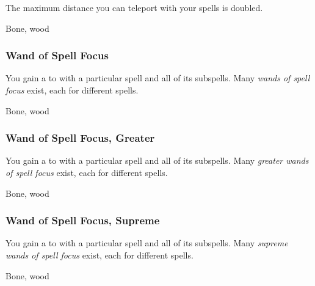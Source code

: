 The maximum distance you can teleport with your  spells is doubled.



 


 Bone, wood


\lowercase{\hypertarget{item:Wand of Spell Focus}{}}\label{item:Wand of Spell Focus}
\hypertarget{item:Wand of Spell Focus}{\subsubsection{Wand of Spell Focus\hfill{}}}

You gain a   to  with a particular spell and all of its subspells.
Many \textit{wands of spell focus} exist, each for different spells.



 


 Bone, wood


\lowercase{\hypertarget{item:Wand of Spell Focus, Greater}{}}\label{item:Wand of Spell Focus, Greater}
\hypertarget{item:Wand of Spell Focus, Greater}{\subsubsection{Wand of Spell Focus, Greater\hfill{}}}

You gain a   to  with a particular spell and all of its subspells.
Many \textit{greater wands of spell focus} exist, each for different spells.



 


 Bone, wood


\lowercase{\hypertarget{item:Wand of Spell Focus, Supreme}{}}\label{item:Wand of Spell Focus, Supreme}
\hypertarget{item:Wand of Spell Focus, Supreme}{\subsubsection{Wand of Spell Focus, Supreme\hfill{}}}

You gain a   to  with a particular spell and all of its subspells.
Many \textit{supreme wands of spell focus} exist, each for different spells.



 


 Bone, wood
